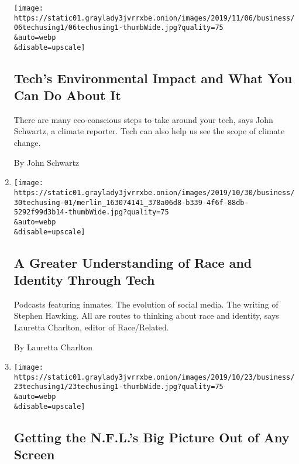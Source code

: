 \begin{enumerate}
  \texttt{[image: https://static01.graylady3jvrrxbe.onion/images/2019/11/06/business/06techusing1/06techusing1-thumbWide.jpg?quality=75\\\&auto=webp\\\&disable=upscale]}

  \hypertarget{techs-environmental-impact-and-what-you-can-do-about-it}{%
  \subsection{Tech's Environmental Impact and What You Can Do About
  It}\label{techs-environmental-impact-and-what-you-can-do-about-it}}

  There are many eco-conscious steps to take around your tech, says John
  Schwartz, a climate reporter. Tech can also help us see the scope of
  climate change.

  By John Schwartz
\item
  \href{/2019/10/30/technology/personaltech/lauretta-charlton-race-related.html}{}

  \texttt{[image: https://static01.graylady3jvrrxbe.onion/images/2019/10/30/business/30techusing-01/merlin\_163074141\_378a06d8-b339-4f6f-88db-5292f99d3b14-thumbWide.jpg?quality=75\\\&auto=webp\\\&disable=upscale]}

  \hypertarget{a-greater-understanding-of-race-and-identity-through-tech}{%
  \subsection{A Greater Understanding of Race and Identity Through
  Tech}\label{a-greater-understanding-of-race-and-identity-through-tech}}

  Podcasts featuring inmates. The evolution of social media. The writing
  of Stephen Hawking. All are routes to thinking about race and
  identity, says Lauretta Charlton, editor of Race/Related.

  By Lauretta Charlton
\item
  \href{/2019/10/23/technology/personaltech/nfl-football-tech-tools.html}{}

  \texttt{[image: https://static01.graylady3jvrrxbe.onion/images/2019/10/23/business/23techusing1/23techusing1-thumbWide.jpg?quality=75\\\&auto=webp\\\&disable=upscale]}

  \hypertarget{getting-the-nfls-big-picture-out-of-any-screen}{%
  \subsection{Getting the N.F.L.'s Big Picture Out of Any
  Screen}\label{getting-the-nfls-big-picture-out-of-any-screen}}


\end{enumerate}
